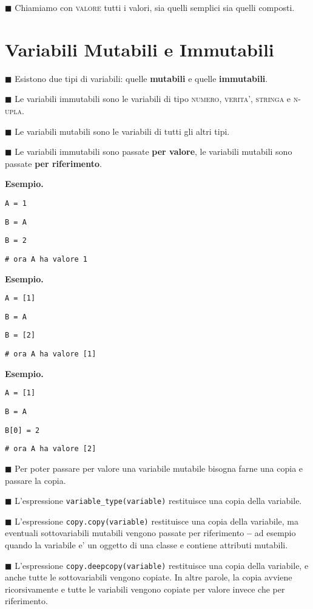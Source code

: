 \documentclass[a4paper,12pt,fleqn,leqno,twoside]{article}
\renewcommand{\b}{\textbf} %
\newcommand{\tw}{\texttt} %
\renewcommand{\sc}{\textsc} %
\newcommand{\bbox}{{\scriptsize $\blacksquare$}} %
\newcommand{\skipline}{\vspace{\baselineskip}} %
\newcommand{\bitem}[1]{\bbox \; #1\par \skipline}
\begin{document}
\bitem{Chiamiamo con \sc{valore} tutti i valori, sia quelli semplici sia quelli composti.}

\section{Variabili Mutabili e Immutabili}

\bitem{Esistono due tipi di variabili: quelle \b{mutabili} e quelle \b{immutabili}.}

\bitem{Le variabili immutabili sono le variabili di tipo \sc{numero}, \sc{verita'}, \sc{stringa} e \sc{n-upla}.}

\bitem{Le variabili mutabili sono le variabili di tutti gli altri tipi.}

\bitem{Le variabili immutabili sono passate \b{per valore}, le variabili mutabili sono passate \b{per riferimento}.}

\b{Esempio.}\par
\tw{A = 1}\par
\tw{B = A}\par
\tw{B = 2}\par
\tw{\# ora A ha valore 1}

\skipline

\b{Esempio.}\par
\tw{A = [1]}\par
\tw{B = A}\par
\tw{B = [2]}\par
\tw{\# ora A ha valore [1]}

\skipline

\b{Esempio.}\par
\tw{A = [1]}\par
\tw{B = A}\par
\tw{B[0] = 2}\par
\tw{\# ora A ha valore [2]}

\skipline

\bitem{Per poter passare per valore una variabile mutabile bisogna farne una copia e passare la copia.}

\bitem{L'espressione \tw{variable\_type(variable)} restituisce una copia della variabile.}

\bitem{L'espressione \tw{copy.copy(variable)} restituisce una copia della variabile, ma eventuali sottovariabili mutabili vengono passate per riferimento \b{--} ad esempio quando la variabile e' un oggetto di una classe e contiene attributi mutabili.}

\bitem{L'espressione \tw{copy.deepcopy(variable)} restituisce una copia della variabile, e anche tutte le sottovariabili vengono copiate. In altre parole, la copia avviene ricorsivamente e tutte le variabili vengono copiate per valore invece che per riferimento.}
\end{document}
